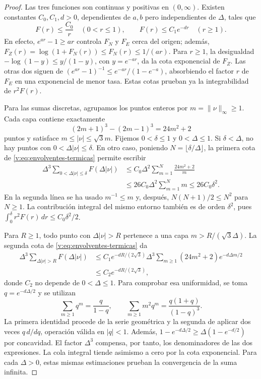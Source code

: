 \begin{proof}
Las tres funciones son continuas y positivas en \((0,\infty)\).
Existen constantes \(C_0,C_1,d>0\), dependientes de \(a,b\) pero
independientes de \(\Delta\), tales que
\begin{equation}
 F(r)\leq\frac{C_0}{r}\quad(0<r\leq1),\qquad
 F(r)\leq C_1e^{-dr}\quad(r\geq1).
 \label{v:eq:envolventes-termicas}
\end{equation}
En efecto, \(e^{ar}-1\geq ar\) controla \(F_N\) y \(F_E\)
cerca del origen; además,
\(F_Z(r)=\log(1+F_N(r))\leq F_N(r)\leq1/(ar)\).
Para \(r\geq1\), la desigualdad
\(-\log(1-y)\leq y/(1-y)\), con \(y=e^{-ar}\), da la cota
exponencial de \(F_Z\). Las otras dos siguen de
\((e^{ar}-1)^{-1}\leq e^{-ar}/(1-e^{-a})\), absorbiendo el factor
\(r\) de \(F_E\) en una exponencial de menor tasa. Estas cotas
prueban ya la integrabilidad de \(r^2F(r)\).

Para las sumas discretas, agrupamos los puntos enteros por
\(m=\|\nu\|_\infty\geq1\). Cada capa contiene exactamente
\[
 (2m+1)^3-(2m-1)^3=24m^2+2
\]
puntos y satisface \(m\leq|\nu|\leq\sqrt3m\).
Fijemos \(0<\delta\leq1\) y \(0<\Delta\leq1\).
Si \(\delta<\Delta\), no hay puntos con
\(0<\Delta|\nu|\leq\delta\). En otro caso, poniendo
\(N=\lfloor\delta/\Delta\rfloor\), la primera cota de
\eqref{v:eq:envolventes-termicas} permite escribir
\begin{align*}
 \Delta^3\!\sum_{0<\Delta|\nu|\leq\delta}F(\Delta|\nu|)
 &\leq C_0\Delta^2\sum_{m=1}^{N}\frac{24m^2+2}{m}\\
 &\leq26C_0\Delta^2\sum_{m=1}^{N}m
 \leq26C_0\delta^2.
\end{align*}
En la segunda línea se ha usado \(m^{-1}\leq m\) y, después,
\(N(N+1)/2\leq N^2\) para \(N\geq1\).
La contribución integral del mismo entorno también es de orden
\(\delta^2\), pues
\(\int_0^\delta r^2F(r)\,dr\leq C_0\delta^2/2\).

Para \(R\geq1\), todo punto con \(\Delta|\nu|>R\) pertenece
a una capa \(m>R/(\sqrt3\Delta)\). La segunda cota de
\eqref{v:eq:envolventes-termicas} da
\begin{align*}
 \Delta^3\!\sum_{\Delta|\nu|>R}F(\Delta|\nu|)
 &\leq C_1e^{-dR/(2\sqrt3)}
 \Delta^3\sum_{m\geq1}(24m^2+2)e^{-d\Delta m/2}\\
 &\leq C_2e^{-dR/(2\sqrt3)},
\end{align*}
donde \(C_2\) no depende de \(0<\Delta\leq1\). Para comprobar
esa uniformidad, se toma \(q=e^{-d\Delta/2}\) y se utilizan
\[
 \sum_{m\geq1}q^m=\frac{q}{1-q},\qquad
 \sum_{m\geq1}m^2q^m=\frac{q(1+q)}{(1-q)^3}.
\]
La primera identidad procede de la serie geométrica y la segunda de
aplicar dos veces \(q\,d/dq\), operación válida en \(|q|<1\).
Además,
\(1-e^{-d\Delta/2}\geq\Delta(1-e^{-d/2})\) por concavidad.
El factor \(\Delta^3\) compensa, por tanto, los denominadores de
las dos expresiones. La cola integral tiende asimismo a cero por la
cota exponencial. Para cada \(\Delta>0\), estas mismas estimaciones
prueban la convergencia de la suma infinita.


\end{proof}
